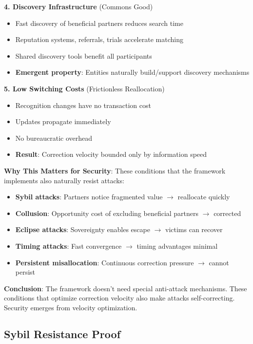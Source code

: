 \documentclass[11pt,a4paper]{article}
\theoremstyle{definition}
\theoremstyle{remark}
\begin{document}
\textbf{4. Discovery Infrastructure} (Commons Good)
\begin{itemize}
\item Fast discovery of beneficial partners reduces search time
\item Reputation systems, referrals, trials accelerate matching
\item Shared discovery tools benefit all participants
\item \textbf{Emergent property}: Entities naturally build/support discovery mechanisms
\end{itemize}

\textbf{5. Low Switching Costs} (Frictionless Reallocation)
\begin{itemize}
\item Recognition changes have no transaction cost
\item Updates propagate immediately
\item No bureaucratic overhead
\item \textbf{Result}: Correction velocity bounded only by information speed
\end{itemize}

\textbf{Why This Matters for Security}: These conditions that the framework implements also naturally resist attacks:
\begin{itemize}
\item \textbf{Sybil attacks}: Partners notice fragmented value $\rightarrow$ reallocate quickly
\item \textbf{Collusion}: Opportunity cost of excluding beneficial partners $\rightarrow$ corrected
\item \textbf{Eclipse attacks}: Sovereignty enables escape $\rightarrow$ victims can recover
\item \textbf{Timing attacks}: Fast convergence $\rightarrow$ timing advantages minimal
\item \textbf{Persistent misallocation}: Continuous correction pressure $\rightarrow$ cannot persist
\end{itemize}

\textbf{Conclusion}: The framework doesn't need special anti-attack mechanisms. These conditions that optimize correction velocity also make attacks self-correcting. Security emerges from velocity optimization.

\subsection{Sybil Resistance Proof}
\label{sec:sybil}
\end{document}
